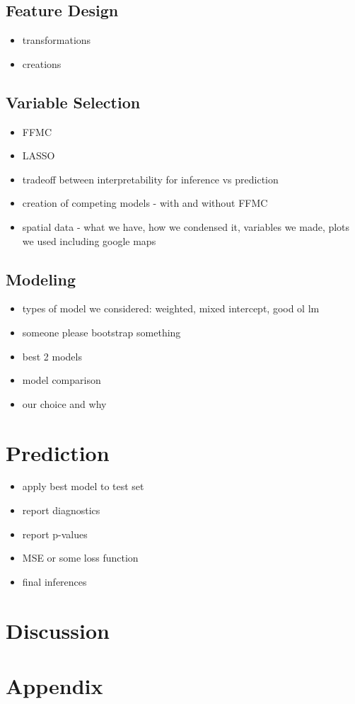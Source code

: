 \documentclass{article}
\begin{document}
\subsection{Feature Design}

\begin{itemize}

\item transformations
\item creations

\end{itemize}

\subsection{Variable Selection}

\begin{itemize}

\item FFMC
\item LASSO
\item tradeoff between interpretability for inference vs prediction
\item creation of competing models - with and without FFMC
\item spatial data - what we have, how we condensed it, variables we made, plots we used including google maps

\end{itemize}

\subsection{Modeling}

\begin{itemize}

\item types of model we considered: weighted, mixed intercept, good ol lm
\item someone please bootstrap something
\item best 2 models
\item model comparison
\item our choice and why

\end{itemize}

\section{Prediction}

\begin{itemize}

\item apply best model to test set
\item report diagnostics
\item report p-values
\item MSE or some loss function
\item final inferences

\end{itemize}

\section{Discussion}

\section{Appendix}
\end{document}
